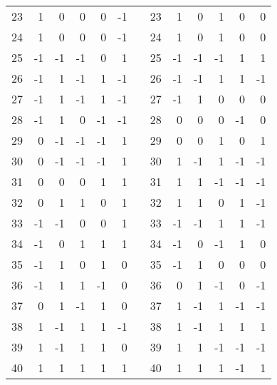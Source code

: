 \begin{table}[h]
{\begin{tabular}{rrrrrr|r|rrrrrr}
23 & 1  & 0  & 0  & 0  & -1 &  & 23 & 1  & 0  & 1  & 0  & 0  \\
24 & 1  & 0  & 0  & 0  & -1 &  & 24 & 1  & 0  & 1  & 0  & 0  \\ \cline{1-6}\cline{8-13}
25 & -1 & -1 & -1 & 0  & 1  &  & 25 & -1 & -1 & -1 & 1  & 1  \\
26 & -1 & 1  & -1 & 1  & -1 &  & 26 & -1 & -1 & 1  & 1  & -1 \\
27 & -1 & 1  & -1 & 1  & -1 &  & 27 & -1 & 1  & 0  & 0  & 0  \\
28 & -1 & 1  & 0  & -1 & -1 &  & 28 & 0  & 0  & 0  & -1 & 0  \\
29 & 0  & -1 & -1 & -1 & 1  &  & 29 & 0  & 0  & 1  & 0  & 1  \\
30 & 0  & -1 & -1 & -1 & 1  &  & 30 & 1  & -1 & 1  & -1 & -1 \\
31 & 0  & 0  & 0  & 1  & 1  &  & 31 & 1  & 1  & -1 & -1 & -1 \\
32 & 0  & 1  & 1  & 0  & 1  &  & 32 & 1  & 1  & 0  & 1  & -1 \\ \cline{1-6}\cline{8-13}
33 & -1 & -1 & 0  & 0  & 1  &  & 33 & -1 & -1 & 1  & 1  & -1 \\
34 & -1 & 0  & 1  & 1  & 1  &  & 34 & -1 & 0  & -1 & 1  & 0  \\
35 & -1 & 1  & 0  & 1  & 0  &  & 35 & -1 & 1  & 0  & 0  & 0  \\
36 & -1 & 1  & 1  & -1 & 0  &  & 36 & 0  & 1  & -1 & 0  & -1 \\
37 & 0  & 1  & -1 & 1  & 0  &  & 37 & 1  & -1 & 1  & -1 & -1 \\
38 & 1  & -1 & 1  & 1  & -1 &  & 38 & 1  & -1 & 1  & 1  & 1  \\
39 & 1  & -1 & 1  & 1  & 0  &  & 39 & 1  & 1  & -1 & -1 & -1 \\
40 & 1  & 1  & 1  & 1  & 1  &  & 40 & 1  & 1  & 1  & -1 & 1 
\end{tabular}
}
\end{table}